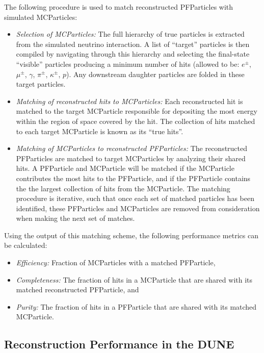 
The following procedure is used to match reconstructed PFParticles with simulated MCParticles:

\begin{itemize}
\item \textit{Selection of MCParticles:} The full hierarchy of true particles is extracted from the simulated neutrino interaction. A list of ``target'' particles is then compiled by navigating through this hierarchy and selecting the final-state ``visible'' particles producing a minimum number of hits (allowed to be: $e^{\pm}$, $\mu^{\pm}$, $\gamma$, $\pi^{\pm}$, $\kappa^{\pm}$, $p$). Any downstream daughter particles are folded in these target particles.
\item \textit{Matching of reconstructed \twod hits to MCParticles:} Each reconstructed \twod hit is matched to the target MCParticle responsible for depositing the most energy within the region of space covered by the hit. The collection of \twod hits matched to each target MCParticle is known as its ``true hits''.
\item \textit{Matching of MCParticles to reconstructed PFParticles:} The reconstructed PFParticles are matched to target MCParticles by analyzing their shared \twod hits. A PFParticle and MCParticle will be matched if the MCParticle contributes the most hits to the PFParticle, and if the PFParticle contains the the largest collection of hits from the MCParticle. The matching procedure is iterative, such that once each set of matched particles has been identified, these PFParticles and MCParticles are removed from consideration when making the next set of matches. 
\end{itemize}

Using the output of this matching scheme, the following performance metrics can be calculated:

\begin{itemize}
\item \textit{Efficiency:} Fraction of MCParticles with a matched PFParticle,
\item \textit{Completeness:} The fraction of \twod hits in a MCParticle that are shared with its matched reconstructed PFParticle, and 
\item \textit{Purity:} The fraction of \twod hits in a PFParticle that are shared with its matched MCParticle.
\end{itemize}

\subsection{Reconstruction Performance in the DUNE }
\label{sec:Pandora:DUNEFD}

